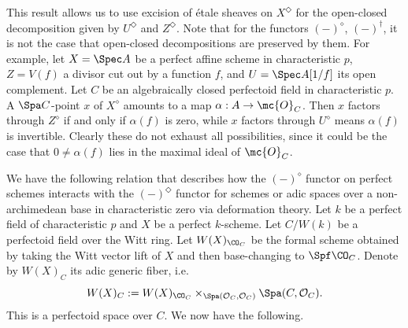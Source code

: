 \documentclass[letterpaper,11pt]{amsart}
\begin{document}
\begin{remark}
    This result allows us to use excision of \'etale sheaves on $X^\Diamond$ for the open-closed decomposition given by $U^\Diamond$ and $Z^\Diamond$. Note that for the functors $(-)^\diamond$, $(-)^\dagger$, it is not the case that open-closed decompositions are preserved by them. For example, let $X=\Spec A$ be a perfect affine scheme in characteristic $p$, $Z = V(f)$ a divisor cut out by a function $f$, and $U=\Spec A[1/f]$ its open complement. Let $C$ be an algebraically closed perfectoid field in characteristic $p$. A $\Spa C$-point $x$ of $X^\diamond$ amounts to a map $\alpha: A\to \mc{O}_C$. Then $x$ factors through $Z^\diamond$ if and only if $\alpha(f)$ is zero, while $x$ factors through $U^\diamond$ means $\alpha(f)$ is invertible. Clearly these do not exhaust all possibilities, since it could be the case that $0\neq \alpha(f)$ lies in the maximal ideal of $\mc{O}_C$.
\end{remark}





We have the following relation that describes how the $(-)^{\diamond}$ functor on perfect schemes interacts with the $(-)^{\Diamond}$ functor for schemes or adic spaces over a non-archimedean base in characteristic zero via deformation theory. 
Let $k$ be a perfect field of characteristic $p$ and $X$ be a perfect $k$-scheme. Let $C/W(k)$ be a perfectoid field over the Witt ring. Let $W(X)_{\CO_C}$ be the formal scheme obtained by taking the Witt vector lift of $X$ and then base-changing to $\Spf \CO_C$. Denote by $W(X)_C$ its adic generic fiber, i.e.
\[W(X)_C:=W(X)_{\CO_{C}} \times_{\Spa(\mathcal{O}_{C},\mathcal{O}_{C})} \Spa(C,\mathcal{O}_{C}).\] 
This is a perfectoid space over $C$. We now have the following.
\end{document}
